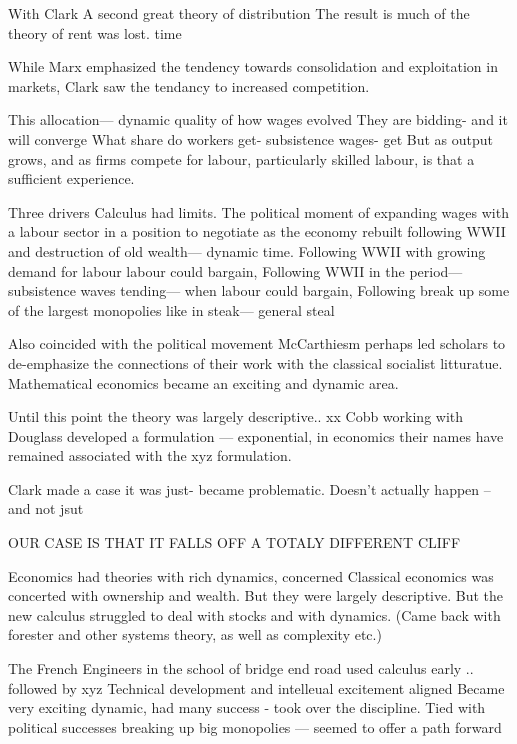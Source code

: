 With Clark
A second great theory of distribution
The result is much of the theory of rent was lost. 
time

While Marx emphasized the tendency towards consolidation and exploitation in markets, Clark saw the tendancy to increased competition. 

This allocation— dynamic quality of how wages evolved
They are bidding- and it will converge 
What share do workers get- subsistence wages- get 
But as output grows, and as firms compete for labour, particularly skilled labour, is that a sufficient experience.



Three drivers
Calculus had limits.
The political moment of expanding wages with a labour sector in a position to negotiate as the economy rebuilt following WWII and destruction of old wealth— dynamic time. 
Following WWII with growing demand for labour labour could bargain, 
Following WWII in the period— subsistence waves tending— when labour could bargain,
Following break up some of the largest monopolies like in steak— general steal


Also coincided with the political movement McCarthiesm perhaps led scholars to de-emphasize the connections of their work with the classical socialist litturatue.
Mathematical economics became an exciting and dynamic area.

Until this point the theory was largely descriptive..
xx Cobb working with Douglass developed a formulation — exponential, in economics their names have remained associated with the xyz formulation. 

Clark made a case it was just- became problematic.
Doesn't actually happen -- and not jsut

OUR CASE IS THAT IT FALLS OFF A TOTALY DIFFERENT CLIFF



Economics had theories with rich dynamics, concerned 
Classical economics was concerted with ownership and wealth. But they were largely descriptive.
But the new calculus struggled to deal with stocks and with dynamics. 
(Came back with forester and other systems theory, as well as complexity etc.)

The French Engineers in the school of bridge end road used calculus early .. followed by xyz
Technical development and intelleual excitement aligned
Became very exciting dynamic, had many success - took over the discipline. 
Tied with political successes breaking up big monopolies — seemed to offer a path forward

